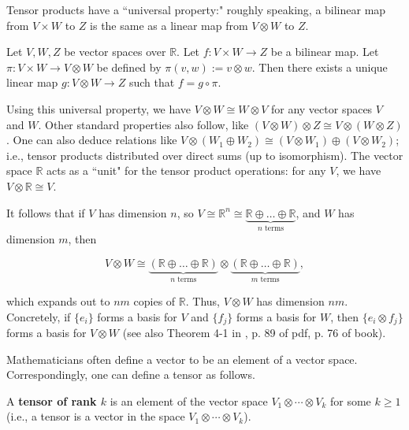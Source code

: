 Tensor products have a ``universal property:" roughly speaking, a bilinear map from \(V \times W\) to \(Z\) is the same as a linear map from \(V \otimes W\) to \(Z\).


\begin{proposition}

Let \(V, W, Z\) be vector spaces over \(\mathbb{R}\). Let \(f: V \times W \to Z\) be a bilinear map. Let \(\pi: V \times W \to V \otimes W\) be defined by \(\pi(v,w) := v \otimes w\). Then there exists a unique linear map \(g: V \otimes W \to Z\) such that \(f = g \circ \pi\).

\end{proposition}

Using this universal property, we have \(V \otimes W \cong W \otimes V\) for any vector spaces \(V\) and \(W\). Other standard properties also follow, like \((V \otimes W) \otimes Z \cong V \otimes (W \otimes Z)\). One can also deduce relations like \(V \otimes(W_1 \oplus W_2) \cong (V \otimes W_1) \oplus (V \otimes W_2)\); i.e., tensor products distributed over direct sums (up to isomorphism). The vector space \(\mathbb{R}\) acts as a ``unit" for the tensor product operations: for any \(V\), we have \(V \otimes \mathbb{R} \cong V\).

It follows that if \(V\) has dimension \(n\), so \(V \cong \mathbb{R}^n \cong \underbrace{\mathbb{R} \oplus \ldots \oplus \mathbb{R}}_{n \text{ terms}}\), and \(W\) has dimension \(m\), then

\[
V \otimes W \cong \underbrace{(\mathbb{R} \oplus \ldots \oplus \mathbb{R})}_{n \text{ terms}} \otimes \underbrace{(\mathbb{R} \oplus \ldots \oplus \mathbb{R})}_{m \text{ terms}},
\]

which expands out to \(nm\) copies of \(\mathbb{R}\). Thus, \(V \otimes W\) has dimension \(nm\). Concretely, if \(\{e_i\}\) forms a basis for \(V\) and \(\{f_j\}\) forms a basis for \(W\), then \(\{e_i \otimes f_j\}\) forms a basis for \(V \otimes W\) (see also Theorem 4-1 in \citet{spivak1971calculus}, p. 89 of pdf, p. 76 of book).

Mathematicians often define a vector to be an element of a vector space. Correspondingly, one can define a tensor as follows.

\begin{definition}\label{ra.def.tensor}

A \textbf{tensor of rank \(k\)} is an element of the vector space \(V_1 \otimes \cdots \otimes V_k\) for some \(k \geq 1\) (i.e., a tensor is a vector in the space \(V_1 \otimes \cdots \otimes V_k\)).

\end{definition}

